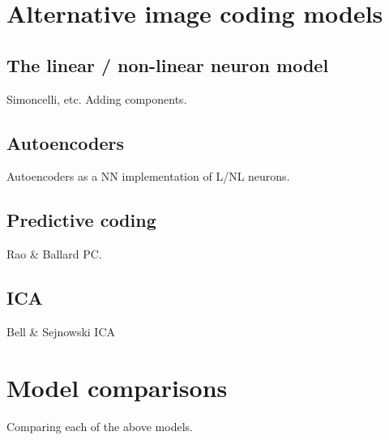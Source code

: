 \section{Alternative image coding models}

\subsection{The linear / non-linear neuron model}
Simoncelli, etc. Adding components.

\subsection{Autoencoders}
Autoencoders as a NN implementation of L/NL neurons.

\subsection{Predictive coding}
Rao & Ballard PC.

\subsection{ICA}
Bell & Sejnowski ICA

\section{Model comparisons}
Comparing each of the above models.